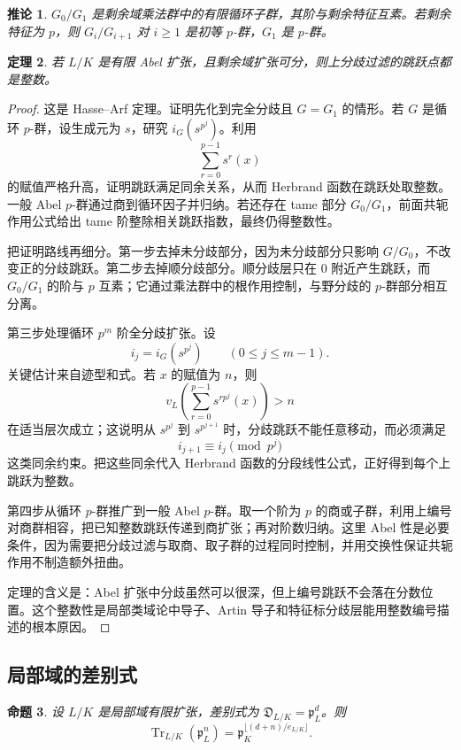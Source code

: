 \documentclass[11pt,a4paper,openany]{ctexbook}
\numberwithin{equation}{chapter}
\theoremstyle{plain}
\newtheorem{theorem}{定理}[chapter]
\newtheorem{proposition}[theorem]{命题}
\newtheorem{corollary}[theorem]{推论}
\theoremstyle{definition}
\theoremstyle{remark}
\begin{document}
\begin{corollary}
$G_0/G_1$ 是剩余域乘法群中的有限循环子群，其阶与剩余特征互素。若剩余特征为 $p$，则 $G_i/G_{i+1}$ 对 $i\ge1$ 是初等 $p$-群，$G_1$ 是 $p$-群。
\end{corollary}

\begin{theorem}
若 $L/K$ 是有限 Abel 扩张，且剩余域扩张可分，则上分歧过滤的跳跃点都是整数。
\end{theorem}

\begin{proof}
这是 Hasse--Arf 定理。证明先化到完全分歧且 $G=G_1$ 的情形。若 $G$ 是循环 $p$-群，设生成元为 $s$，研究 $i_G(s^{p^j})$。利用
\[
  \sum_{r=0}^{p-1}s^r(x)
\]
的赋值严格升高，证明跳跃满足同余关系，从而 Herbrand 函数在跳跃处取整数。一般 Abel $p$-群通过商到循环因子并归纳。若还存在 tame 部分 $G_0/G_1$，前面共轭作用公式给出 tame 阶整除相关跳跃指数，最终仍得整数性。

把证明路线再细分。第一步去掉未分歧部分，因为未分歧部分只影响 $G/G_0$，不改变正的分歧跳跃。第二步去掉顺分歧部分。顺分歧层只在 $0$ 附近产生跳跃，而 $G_0/G_1$ 的阶与 $p$ 互素；它通过乘法群中的根作用控制，与野分歧的 $p$-群部分相互分离。

第三步处理循环 $p^m$ 阶全分歧扩张。设
\[
i_j=i_G(s^{p^j})\qquad(0\le j\le m-1).
\]
关键估计来自迹型和式。若 $x$ 的赋值为 $n$，则
\[
v_L\!\left(\sum_{r=0}^{p-1}s^{rp^j}(x)\right)>n
\]
在适当层次成立；这说明从 $s^{p^j}$ 到 $s^{p^{j+1}}$ 时，分歧跳跃不能任意移动，而必须满足
\[
i_{j+1}\equiv i_j \pmod {p^j}
\]
这类同余约束。把这些同余代入 Herbrand 函数的分段线性公式，正好得到每个上跳跃为整数。

第四步从循环 $p$-群推广到一般 Abel $p$-群。取一个阶为 $p$ 的商或子群，利用上编号对商群相容，把已知整数跳跃传递到商扩张；再对阶数归纳。这里 Abel 性是必要条件，因为需要把分歧过滤与取商、取子群的过程同时控制，并用交换性保证共轭作用不制造额外扭曲。

定理的含义是：Abel 扩张中分歧虽然可以很深，但上编号跳跃不会落在分数位置。这个整数性是局部类域论中导子、Artin 导子和特征标分歧层能用整数编号描述的根本原因。
\end{proof}

\subsection{局部域的差别式}

\begin{proposition}
设 $L/K$ 是局部域有限扩张，差别式为 $\mathfrak D_{L/K}=\mathfrak p_L^d$。则
\[
  \operatorname{Tr}_{L/K}(\mathfrak p_L^n)=\mathfrak p_K^{\lfloor(d+n)/e_{L/K}\rfloor}.
\]
\end{proposition}
\end{document}
